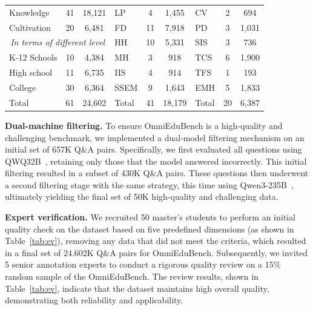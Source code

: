 \begin{table}[tbp]
{\begin{tabular}{lcc|lcc|lcc}
        Knowledge  & 41 & 18,121 & LP & 4 & 1,455 & CV & 2 & 694 \\
        Cultivation & 20 & 6,481 & FD  & 11 & 7,918 & PD & 3 & 1,031 \\
        \multicolumn{3}{c|}{\textcolor{myorange}{\textit{In terms of different level}}} & HH & 10 & 5,331 & SIS & 3 & 736 \\
        K-12 Schools  & 10 & 4,384 & MH & 3 & 918 & TCS & 6 & 1,900 \\
        High school & 11 & 6,735 & IIS & 4 & 914 & TFS & 1 & 193 \\
        College  & 30 & 6,364 & SSEM & 9 & 1,643 & EMH & 5 & 1,833 \\
        \midrule
        Total  & 61 & 24,602 & Total  & 41 & 18,179 & Total  & 20 & 6,387 \\
        \bottomrule
    \end{tabular}}
    \label{tab:sta}
    \vspace{-6mm}
\end{table}

\textbf{Dual-machine filtering.}
To ensure OmniEduBench is a high-quality and challenging benchmark, we implemented a dual-model filtering mechanism on an \textcolor{myorange}{initial set of 657K Q\&A pairs}. Specifically, we first evaluated all questions using QWQ32B~\citep{qwq32b}, retaining only those that the model answered incorrectly. This initial filtering resulted in \textcolor{myorange}{a subset of 430K Q\&A pairs}. These questions then underwent a second filtering stage with the same strategy, this time using Qwen3-235B~\citep{yang2025qwen3}, ultimately yielding the final \textcolor{myorange}{set of 50K high-quality} and challenging data. 

\textbf{Expert verification.}
We recruited 50 master's students to perform an initial quality check on the dataset based on five predefined dimensions (as shown in Table~\ref{tab:ev}), removing any data that did not meet the criteria, which resulted in \textcolor{myorange}{a final set of 24.602K Q\&A pairs} for OmniEduBench. Subsequently, we invited 5 senior annotation experts to conduct a rigorous quality review on a 15\% random sample of the OmniEduBench. The review results, shown in Table~\ref{tab:ev}, indicate that the dataset maintains high overall quality, demonstrating both reliability and applicability.


